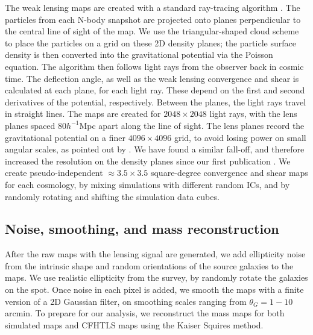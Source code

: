 \documentclass[10pt, preprint]{aastex}
\def\apj{ApJ}                 %
\begin{document}
The weak lensing maps are created with a standard ray-tracing
algorithm \citep{H&M01}. The particles from each N-body snapshot are
projected onto planes perpendicular to the central line of sight of
the map.  We use the triangular-shaped cloud scheme
\citep{Hockney-Eastwood} to place the particles on a grid on these 2D
density planes; the particle surface density is then converted into
the gravitational potential via the Poisson equation. The algorithm
then follows light rays from the observer back in cosmic time. The
deflection angle, as well as the weak lensing convergence and shear is
calculated at each plane, for each light ray. These depend on the
first and second derivatives of the potential, respectively. Between
the planes, the light rays travel in straight lines.  The maps are
created for $2048\times2048$ light rays, with the lens planes spaced
$80h^{-1}$Mpc apart along the line of sight. The lens planes record
the gravitational potential on a finer $4096\times4096$ grid, to avoid
losing power on small angular scales, as pointed out by
\citet{Sato09}. We have found a similar fall-off, and therefore
increased the resolution on the density planes since our first
publication \citep{KHM09}.  We create pseudo-independent $\approx
3.5\times3.5$ square-degree convergence and shear maps for each
cosmology, by mixing simulations with different random ICs, and by
randomly rotating and shifting the simulation data cubes.

\subsection{Noise, smoothing, and mass reconstruction}

After the raw maps with the lensing signal are generated, we add
ellipticity noise from the intrinsic shape and random orientations of 
the source galaxies to the maps. We use realistic ellipticity from the 
survey, by randomly rotate the galaxies on the spot.
Once noise in each pixel is added, we smooth the maps
with a finite version of a 2D Gaussian filter, on smoothing scales
ranging from $\theta_G = 1-10$ arcmin.
To prepare for our analysis, we reconstruct the mass maps for 
both simulated maps and CFHTLS maps using the Kaiser Squires method.
\end{document}
